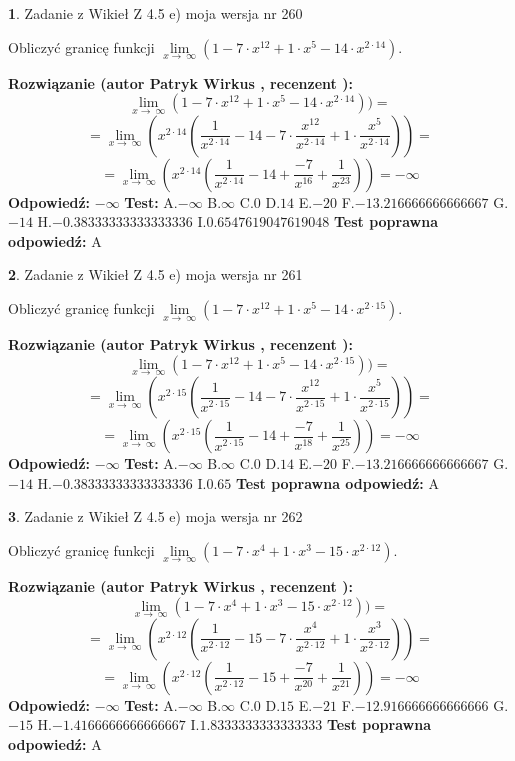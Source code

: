 \documentclass[12pt, a4paper]{article}
\theoremstyle{definition} %
\newtheorem{zad}{}
\newcommand{\zadStart}[1]{\begin{zad}#1\newline}
\newcommand{\zadStop}{\end{zad}}
\newcommand{\rozwStart}[2]{\noindent \textbf{Rozwiązanie (autor #1 , recenzent #2): }\newline}
\newcommand{\rozwStop}{\newline}
\newcommand{\odpStart}{\noindent \textbf{Odpowiedź:}\newline}
\newcommand{\odpStop}{\newline}
\newcommand{\testStart}{\noindent \textbf{Test:}\newline}
\newcommand{\testStop}{\newline}
\newcommand{\kluczStart}{\noindent \textbf{Test poprawna odpowiedź:}\newline}
\newcommand{\kluczStop}{\newline}
\begin{document}
\zadStart{Zadanie z Wikieł Z 4.5 e) moja wersja nr 260}


Obliczyć granicę funkcji  $\lim\limits_{x\to\ \infty}(1 - 7 \cdot x^{12}+1 \cdot x^{5}- 14 \cdot x^{2\cdot14})$.
\zadStop
\rozwStart{Patryk Wirkus}{}
$$\lim\limits_{x\to\ \infty}(1 - 7 \cdot x^{12}+1 \cdot x^{5}- 14 \cdot x^{2\cdot14}))=$$
$$=\lim\limits_{x\to\ \infty}(x^{2\cdot14}(\frac{1}{x^{2\cdot14}}-14 -7 \cdot \frac{x^{12}}{x^{2\cdot14}}+1 \cdot \frac{x^{5}}{x^{2\cdot14}}))=$$
$$=\lim\limits_{x\to\ \infty}(x^{2\cdot14}(\frac{1}{x^{2\cdot14}}-14 + \frac{-7}{x^{16}}+ \frac{1}{x^{23}}))=-\infty$$
\rozwStop
\odpStart
$-\infty$
\odpStop
\testStart
A.$-\infty$ B.$\infty$ C.$0$ D.$14$ E.$-20$
F.$-13.216666666666667$ G.$-14$
H.$-0.38333333333333336$
I.$0.6547619047619048$
\testStop
\kluczStart
A
\kluczStop



\zadStart{Zadanie z Wikieł Z 4.5 e) moja wersja nr 261}


Obliczyć granicę funkcji  $\lim\limits_{x\to\ \infty}(1 - 7 \cdot x^{12}+1 \cdot x^{5}- 14 \cdot x^{2\cdot15})$.
\zadStop
\rozwStart{Patryk Wirkus}{}
$$\lim\limits_{x\to\ \infty}(1 - 7 \cdot x^{12}+1 \cdot x^{5}- 14 \cdot x^{2\cdot15}))=$$
$$=\lim\limits_{x\to\ \infty}(x^{2\cdot15}(\frac{1}{x^{2\cdot15}}-14 -7 \cdot \frac{x^{12}}{x^{2\cdot15}}+1 \cdot \frac{x^{5}}{x^{2\cdot15}}))=$$
$$=\lim\limits_{x\to\ \infty}(x^{2\cdot15}(\frac{1}{x^{2\cdot15}}-14 + \frac{-7}{x^{18}}+ \frac{1}{x^{25}}))=-\infty$$
\rozwStop
\odpStart
$-\infty$
\odpStop
\testStart
A.$-\infty$ B.$\infty$ C.$0$ D.$14$ E.$-20$
F.$-13.216666666666667$ G.$-14$
H.$-0.38333333333333336$
I.$0.65$
\testStop
\kluczStart
A
\kluczStop



\zadStart{Zadanie z Wikieł Z 4.5 e) moja wersja nr 262}


Obliczyć granicę funkcji  $\lim\limits_{x\to\ \infty}(1 - 7 \cdot x^{4}+1 \cdot x^{3}- 15 \cdot x^{2\cdot12})$.
\zadStop
\rozwStart{Patryk Wirkus}{}
$$\lim\limits_{x\to\ \infty}(1 - 7 \cdot x^{4}+1 \cdot x^{3}- 15 \cdot x^{2\cdot12}))=$$
$$=\lim\limits_{x\to\ \infty}(x^{2\cdot12}(\frac{1}{x^{2\cdot12}}-15 -7 \cdot \frac{x^{4}}{x^{2\cdot12}}+1 \cdot \frac{x^{3}}{x^{2\cdot12}}))=$$
$$=\lim\limits_{x\to\ \infty}(x^{2\cdot12}(\frac{1}{x^{2\cdot12}}-15 + \frac{-7}{x^{20}}+ \frac{1}{x^{21}}))=-\infty$$
\rozwStop
\odpStart
$-\infty$
\odpStop
\testStart
A.$-\infty$ B.$\infty$ C.$0$ D.$15$ E.$-21$
F.$-12.916666666666666$ G.$-15$
H.$-1.4166666666666667$
I.$1.8333333333333333$
\testStop
\kluczStart
A
\kluczStop
\end{document}
